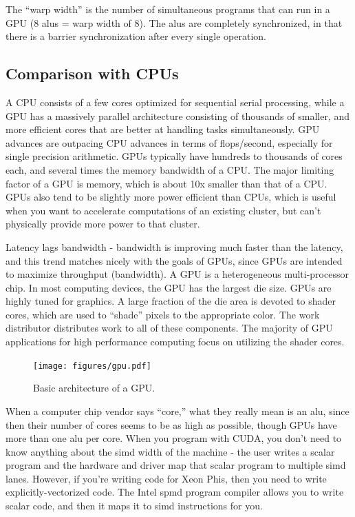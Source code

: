 \documentclass[10pt]{article}
\begin{document}
\begin{flushleft}
The ``warp width'' is the number of simultaneous programs that can run in a GPU (8 \gls{alu}s = warp width of 8). The \gls{alu}s are completely synchronized, in that there is a barrier synchronization after every single operation. 

\subsection{Comparison with CPUs}
 A CPU consists of a few cores optimized for sequential serial processing, while a GPU has a massively parallel architecture consisting of thousands of smaller, and more efficient cores that are better at handling tasks simultaneously. GPU advances are outpacing CPU advances in terms of flops/second, especially for single precision arithmetic. GPUs typically have hundreds to thousands of cores each, and several times the memory bandwidth of a CPU. The major limiting factor of a GPU is memory, which is about 10x smaller than that of a CPU. GPUs also tend to be slightly more power efficient than CPUs, which is useful when you want to accelerate computations of an existing cluster, but can't physically provide more power to that cluster.






 





Latency lags bandwidth - bandwidth is improving much faster than the latency, and this trend matches nicely with the goals of GPUs, since GPUs are intended to maximize throughput (bandwidth). A GPU is a heterogeneous multi-processor chip. In most computing devices, the GPU has the largest die size. GPUs are highly tuned for graphics. A large fraction of the die area is devoted to shader cores, which are used to ``shade'' pixels to the appropriate color. The work distributor distributes work to all of these components. The majority of GPU applications for high performance computing focus on utilizing the shader cores. 

\begin{figure}[H]
\centering
\texttt{[image: figures/gpu.pdf]}
\caption{Basic architecture of a GPU. }
\end{figure}





When a computer chip vendor says ``core,'' what they really mean is an \gls{alu}, since then their number of cores seems to be as high as possible, though GPUs have more than one \gls{alu} per core. When you program with CUDA, you don't need to know anything about the \gls{simd} width of the machine - the user writes a scalar program and the hardware and driver map that scalar program to multiple \gls{simd} lanes. However, if you're writing code for Xeon Phis, then you need to write explicitly-vectorized code. The Intel \gls{spmd} program compiler allows you to write scalar code, and then it maps it to \gls{simd} instructions for you. 




\end{flushleft}
\end{document}
